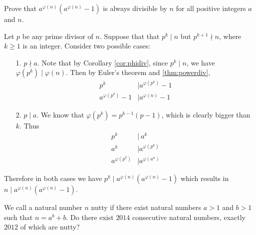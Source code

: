 \begin{problem}
	Prove that $a^{\varphi(n)}(a^{\varphi(n)}-1)$ is always divisible by $n$ for all positive integers $a$ and $n$.
\end{problem}

\begin{solution}
	Let $p$ be any prime divisor of $n$. Suppose that that $p^k \mid  n$ but $p^{k+1} \nmid n$, where $k\geq 1$ is an integer. Consider two possible cases:
	\begin{itemize}
		\item[1.] $p \nmid a$.  Note that by Corollary \eqref{cor:phidiv}, since $p^k \mid  n$, we have $\varphi(p^k) \mid ‌\varphi(n)$. Then by Euler's theorem and \autoref{thm:powerdiv},
			\begin{align*}
				p^k
					& \mid a^{\varphi(p^k)} -1\\
				a^{\varphi(p^k)} -1
					& \mid a^{\varphi(n)} -1
			\end{align*}
		\item[2.] 	$p\mid a$. We know that $\varphi(p^k)=p^{k-1}(p-1)$, which is clearly bigger than $k$. Thus
			\begin{align*}
				p^k
					& \mid  \ a^k \\
				a^{k}
					& \mid a^{\varphi(p^k)}\\
				a^{\varphi(p^k)}
					& \mid a^{\varphi(a^n)}
			\end{align*}
	\end{itemize}
	\noindent Therefore in both cases we have $p^k \mid  a^{\varphi(n)}(a^{\varphi(n)}-1)$ which results in $n\mid a^{\varphi(n)}(a^{\varphi(n)}-1)$.
\end{solution}

\begin{problem}
	We call a natural number $n$ nutty if there exist natural numbers $a > 1$ and $b > 1$ such that $n = a^b + b$. Do there exist $2014$ consecutive natural numbers, exactly $2012$ of which are nutty?
\end{problem}

